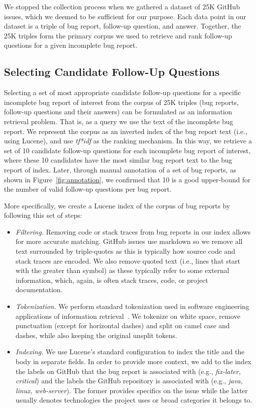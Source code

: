  We stopped the collection process when we gathered a dataset of 25K GitHub issues, which we deemed to be sufficient for our purpose. Each data point in our dataset is a triple of
bug report, follow-up question, and answer. Together, the 25K triples form the primary corpus we used to
retrieve and rank follow-up questions for a given incomplete bug report.


\subsection{Selecting Candidate Follow-Up Questions}

Selecting a set of most appropriate candidate follow-up questions for a specific incomplete bug report of interest from the corpus
of 25K triples (bug reports, follow-up questions and their answers) can be formulated as an information retrieval
problem. That is, as a query we use the text of the incomplete bug report. We represent the corpus
as an inverted index of the bug report text (i.e., using Lucene), and use {\em tf*idf} as the
ranking mechanism. In this way, we retrieve a set of 10 candidate follow-up questions for each incomplete bug report
of interest, where these 10 candidates have the most similar bug report text to the bug report of index. Later, through manual annotation of a set of bug reports, as shown in Figure~\ref{fig:annotation}, we confirmed that 10 is a good upper-bound for the number of valid follow-up questions per bug report.

More specifically, we create a Lucene index of the corpus of bug reports by following this set of steps:
\begin{itemize}
\item {\em Filtering.} Removing code or stack traces from bug reports in our index allows
for more accurate matching. GitHub issues use markdown so we remove all text surrounded
by triple-quotes as this is typically how source code and stack traces are encoded. We also
remove quoted text (i.e., lines that start with the greater than symbol) as these typically
refer to some external information, which, again, is often stack traces, code, or project documentation.
\item {\em Tokenization.} We perform standard tokenization used in software engineering applications
of information retrieval~\cite{marcus2004information,shepherd2012sando}. We tokenize on white space, remove
punctuation (except for horizontal dashes)
and split on camel case and dashes, while also keeping the original unsplit tokens.
\item {\em Indexing.} We use Lucene's standard configuration to index the title and the body in separate fields. In order to provide
more context, we add to the index the labels on GitHub that the bug report is associated with (e.g., {\em fix-later, critical}) and the labels the
GitHub repository is associated with (e.g., {\em java, linux, web-server}). The former provides specifics on the issue while the
latter usually denotes technologies the project uses or broad categories it belongs to.
\end{itemize}

